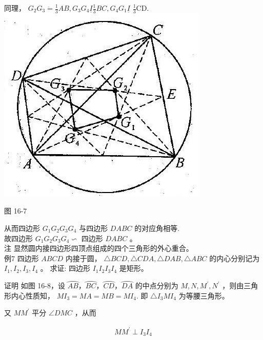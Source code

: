 \documentclass[10pt]{article}
\begin{document}
同理， $G_{2} G_{3} \ddot{=} \frac{1}{3} A B, G_{3} G_{4} \underline{I} \frac{1}{3} B C, G_{4} G_{1} \underline{I}$ $\frac{1}{3} \mathrm{CD}$.\\
\includegraphics[max width=\textwidth, center]{2024_10_30_2c8f45efd4a519b08e1ag-151}

图 16-7

从而四边形 $G_{1} G_{2} G_{3} G_{4}$ 与四边形 $D A B C$ 的对应角相等.\\
故四边形 $G_{1} G_{2} G_{3} G_{4} \backsim$ 四边形 $D A B C$ 。\\
注 显然圆内接四边形四顶点组成的四个三角形的外心重合。\\
例7 四边形 $A B C D$ 内接于圆， $\triangle B C D, \triangle C D A, \triangle D A B, \triangle A B C$ 的内心分别记为 $I_{1}, I_{2}, I_{3}, I_{4}$ 。 求证: 四边形 $I_{1} I_{2} I_{3} I_{4}$ 是矩形。

证明 如图 16-8，设 $\overparen{A B} ， \overparen{B C} ， \overparen{C D} ， \overparen{D A}$ 的中点分别为 $M, N, M^{\prime}, N^{\prime}$ ，则由三角形内心性质知， $M I_{3}=M A=M B=M I_{4}$. 即 $\triangle I_{3} M I_{4}$ 为等腰三角形。

又 $M M^{\prime}$ 平分 $\angle D M C$ ，从而

\begin{align*}
M M^{\prime} \perp I_{3} I_{4}
\end{align*}
\end{document}
